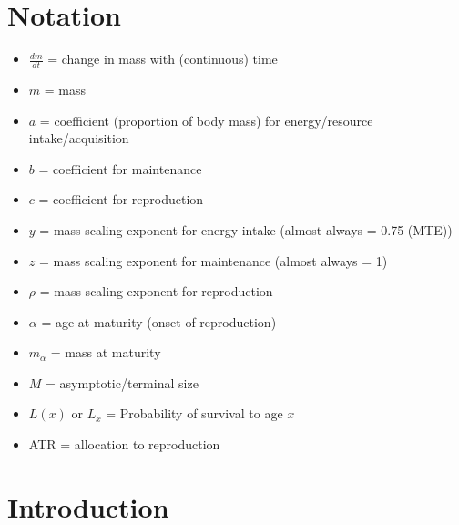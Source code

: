 \documentclass[a4paper]{article} %
\begin{document}
\newpage\section*{Notation}\thispagestyle{empty}
\begin{itemize}    
    \item $\frac{dm}{dt}$ = change in mass with (continuous) time
    \item $m$ = mass
    \item $a$ = coefficient (proportion of body mass) for energy/resource intake/acquisition
    \item $b$ = coefficient for maintenance
    \item $c$ = coefficient for reproduction
    \item $y$ = mass scaling exponent for energy intake (almost always = 0.75 (MTE))
    \item $z$ = mass scaling exponent for maintenance (almost always = 1)
    \item $\rho$ = mass scaling exponent for reproduction
    \item $\alpha$ = age at maturity (onset of reproduction)
    \item $m_{\alpha}$ = mass at maturity
    \item $M$ = asymptotic/terminal size
    \item $L(x)$ or $L_x$ = Probability of survival to age $x$
    \item ATR = allocation to reproduction
\end{itemize}

\newpage
\section{Introduction}\thispagestyle{empty}
\end{document}
